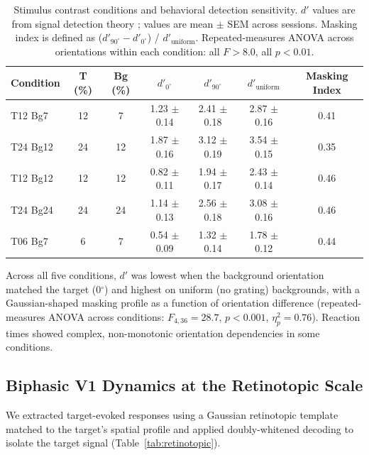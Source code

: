 \documentclass[11pt]{article}
\begin{document}
\begin{table}[H]
\centering
\caption{Stimulus contrast conditions and behavioral detection sensitivity. $d'$ values are from signal detection theory \citep{green1966}; values are mean $\pm$ SEM across sessions. Masking index is defined as ($d'_{90^\circ} - d'_{0^\circ}$) / $d'_{\mathrm{uniform}}$. Repeated-measures ANOVA across orientations within each condition: all $F > 8.0$, all $p < 0.01$.}
\label{tab:contrast_conditions}
\begin{tabular}{lcccccc}
\toprule
\textbf{Condition} & \textbf{T (\%)} & \textbf{Bg (\%)} & \textbf{$d'_{0^\circ}$} & \textbf{$d'_{90^\circ}$} & \textbf{$d'_{\mathrm{uniform}}$} & \textbf{Masking Index} \\
\midrule
T12 Bg7 & 12 & 7 & 1.23 $\pm$ 0.14 & 2.41 $\pm$ 0.18 & 2.87 $\pm$ 0.16 & 0.41 \\
T24 Bg12 & 24 & 12 & 1.87 $\pm$ 0.16 & 3.12 $\pm$ 0.19 & 3.54 $\pm$ 0.15 & 0.35 \\
T12 Bg12 & 12 & 12 & 0.82 $\pm$ 0.11 & 1.94 $\pm$ 0.17 & 2.43 $\pm$ 0.14 & 0.46 \\
T24 Bg24 & 24 & 24 & 1.14 $\pm$ 0.13 & 2.56 $\pm$ 0.18 & 3.08 $\pm$ 0.16 & 0.46 \\
T06 Bg7 & 6 & 7 & 0.54 $\pm$ 0.09 & 1.32 $\pm$ 0.14 & 1.78 $\pm$ 0.12 & 0.44 \\
\bottomrule
\end{tabular}
\end{table}

Across all five conditions, $d'$ was lowest when the background orientation matched the target (0$^\circ$) and highest on uniform (no grating) backgrounds, with a Gaussian-shaped masking profile as a function of orientation difference (repeated-measures ANOVA across conditions: $F_{4,36} = 28.7$, $p < 0.001$, $\eta_p^2 = 0.76$). Reaction times showed complex, non-monotonic orientation dependencies in some conditions.

\subsection{Biphasic V1 Dynamics at the Retinotopic Scale}

We extracted target-evoked responses using a Gaussian retinotopic template matched to the target's spatial profile and applied doubly-whitened decoding to isolate the target signal (Table~\ref{tab:retinotopic}).
\end{document}
